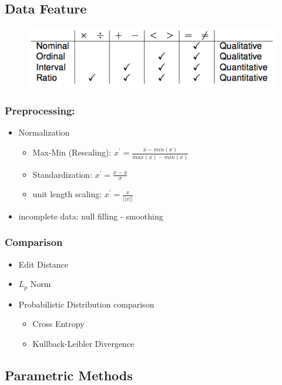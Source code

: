 \subsection{Data Feature}
\label{ssect:data-feature}
\begin{figure}[h]
\includegraphics[scale=0.6]{data-feature}
\end{figure}
\subsubsection{Preprocessing:}
\begin{itemize}
	\item Normalization
		\begin{itemize}
			\item Max-Min (Rescaling): $x^{'} = \frac{x - min(x)}{max(x) - min(x)}$
			\item Standardization: $x^{'} = \frac{x - \overline{x}}{\sigma}$
			\item unit length scaling: $x^{'} = \frac{x}{||x||}$
		\end{itemize}
		\item incomplete data: null filling - smoothing
\end{itemize}

\subsubsection{Comparison}
\begin{itemize}
	\item Edit Distance
	\item $L_p$ Norm
	\item Probabilistic Distribution comparison
		\begin{itemize}
			\item Cross Entropy
			\item Kullback-Leibler Divergence
		\end{itemize}
\end{itemize}


\subsection{Parametric Methods}
\label{ssect:parametric}

